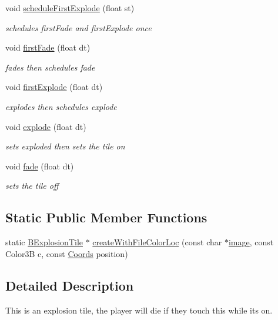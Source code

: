 \begin{DoxyCompactItemize}
void \hyperlink{class_b_explosion_tile_a53e3eab8f3d8d1abfe6f611d0ecbe408}{schedule\-First\-Explode} (float st)
\begin{DoxyCompactList}\small\item\em schedules first\-Fade and first\-Explode once \end{DoxyCompactList}\item 
void \hyperlink{class_b_explosion_tile_a502982df55ae867ade34a740365dd353}{first\-Fade} (float dt)
\begin{DoxyCompactList}\small\item\em fades then schedules fade \end{DoxyCompactList}\item 
void \hyperlink{class_b_explosion_tile_af7e3201b26423dba9f444e8e38f55bf2}{first\-Explode} (float dt)
\begin{DoxyCompactList}\small\item\em explodes then schedules explode \end{DoxyCompactList}\item 
void \hyperlink{class_b_explosion_tile_a33aa8f23913aad84380eb6313c332448}{explode} (float dt)
\begin{DoxyCompactList}\small\item\em sets exploded then sets the tile on \end{DoxyCompactList}\item 
void \hyperlink{class_b_explosion_tile_a2afddaca5a174592c15f36e7228ad821}{fade} (float dt)
\begin{DoxyCompactList}\small\item\em sets the tile off \end{DoxyCompactList}\end{DoxyCompactItemize}
\subsection*{\-Static \-Public \-Member \-Functions}
\begin{DoxyCompactItemize}
\item 
static \hyperlink{class_b_explosion_tile}{\-B\-Explosion\-Tile} $\ast$ \hyperlink{class_b_explosion_tile_ac8f21b7fc8e481647b0da1814c8581a3}{create\-With\-File\-Color\-Loc} (const char $\ast$\hyperlink{_game_list_8h_ac745ab21f82aa96829863dcfc37ef5a8}{image}, const \-Color3\-B c, const \hyperlink{struct_coords}{\-Coords} position)
\end{DoxyCompactItemize}


\subsection{\-Detailed \-Description}
\-This is an explosion tile, the player will die if they touch this while its on. 

